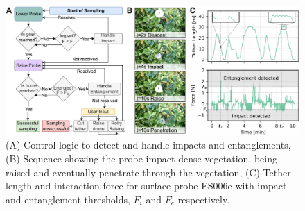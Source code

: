 
\begin{figure}[tbh]
    \centering
    \includegraphics[width=\linewidth]{chapters/papers/EP/figures/04_control.pdf}
    \caption{(A) Control logic to detect and handle impacts and entanglements, (B) Sequence showing the probe impact dense vegetation, being raised and eventually penetrate through the vegetation, (C) Tether length and interaction force for surface probe ES006e with impact and entanglement thresholds, $F_i$ and $F_e$ respectively.}
    \label{fig:4-control}
\end{figure}

